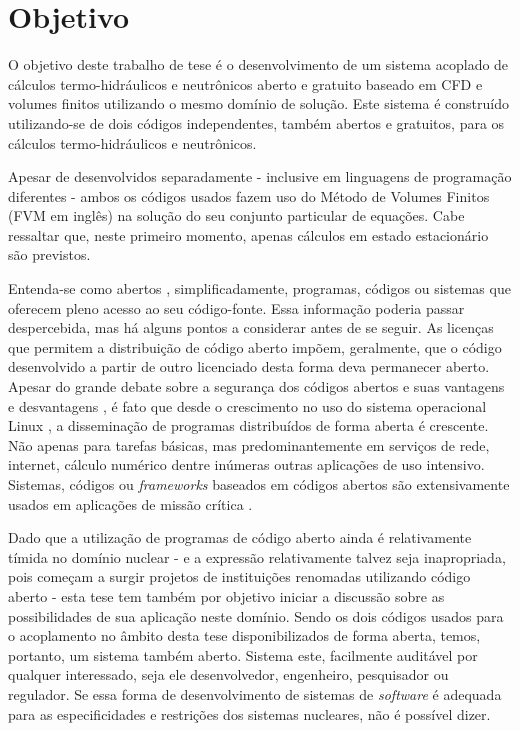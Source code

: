 \section{Objetivo}

O objetivo deste trabalho de tese é o desenvolvimento de um sistema acoplado de cálculos
termo-hidráulicos e neutrônicos aberto e gratuito baseado em CFD e volumes finitos utilizando
o mesmo domínio de solução. Este sistema é construído utilizando-se de dois códigos independentes, também
abertos e gratuitos, para os cálculos termo-hidráulicos e neutrônicos. 

Apesar de desenvolvidos separadamente - inclusive
em linguagens de programação diferentes - ambos os códigos usados fazem uso do Método de Volumes
Finitos (FVM em inglês) \cite{Eymard2003} na solução do seu conjunto particular de equações.
Cabe ressaltar que, neste primeiro momento, apenas cálculos em estado estacionário
são previstos.

Entenda-se como abertos \cite{Stallman2002}, simplificadamente, programas, códigos ou sistemas
que oferecem pleno acesso ao seu código-fonte. Essa informação poderia passar despercebida,
mas há alguns pontos a considerar antes de se
seguir. As licenças que permitem a distribuição de código aberto impõem, geralmente, que
o código desenvolvido a partir de outro licenciado desta forma deva permanecer aberto.
Apesar do grande debate sobre a segurança dos códigos abertos e suas vantagens e desvantagens \cite{Androutsellis2010},
é fato que desde o crescimento no uso do sistema operacional Linux \cite{LinuxBritannica}, a disseminação
de programas distribuídos de forma aberta é crescente.
Não apenas para tarefas básicas, mas predominantemente em serviços de rede, internet, cálculo numérico dentre
inúmeras outras aplicações de uso intensivo. Sistemas, códigos ou \textit{frameworks} baseados em códigos abertos são
extensivamente usados em aplicações de missão crítica \cite{Norris2004}.

Dado que a utilização de programas de código aberto ainda é relativamente tímida no domínio nuclear
- e a expressão relativamente talvez seja inapropriada, pois começam a surgir projetos de instituições
renomadas utilizando código aberto \cite{Romano2013, Boyd2014, Huff2016} -
esta tese tem também por objetivo iniciar a discussão sobre as possibilidades de sua
aplicação neste domínio. Sendo os dois códigos usados para o acoplamento no âmbito desta tese disponibilizados
de forma aberta, temos, portanto, um sistema também aberto. Sistema este, facilmente auditável
por qualquer interessado, seja ele desenvolvedor, engenheiro, pesquisador ou regulador.
Se essa forma de desenvolvimento de sistemas de \textit{software} é adequada para as especificidades
e restrições dos sistemas nucleares, não é possível dizer. %

